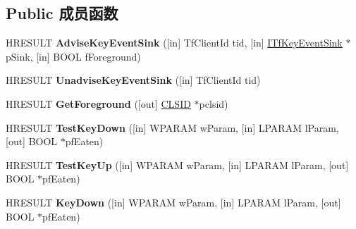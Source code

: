\subsection*{Public 成员函数}
\begin{DoxyCompactItemize}
\item 
\mbox{\label{interface_i_tf_keystroke_mgr_aaabaa2af43516158f9b20932da8704c3}} 
H\+R\+E\+S\+U\+LT {\bfseries Advise\+Key\+Event\+Sink} (\mbox{[}in\mbox{]} Tf\+Client\+Id tid, \mbox{[}in\mbox{]} \hyperlink{interface_i_tf_key_event_sink}{I\+Tf\+Key\+Event\+Sink} $\ast$p\+Sink, \mbox{[}in\mbox{]} B\+O\+OL f\+Foreground)
\item 
\mbox{\label{interface_i_tf_keystroke_mgr_aa2b890d78a18d51e628d4a2f98f27448}} 
H\+R\+E\+S\+U\+LT {\bfseries Unadvise\+Key\+Event\+Sink} (\mbox{[}in\mbox{]} Tf\+Client\+Id tid)
\item 
\mbox{\label{interface_i_tf_keystroke_mgr_afe57782c3ec87b9ffc01d60b79a552ce}} 
H\+R\+E\+S\+U\+LT {\bfseries Get\+Foreground} (\mbox{[}out\mbox{]} \hyperlink{struct___i_i_d}{C\+L\+S\+ID} $\ast$pclsid)
\item 
\mbox{\label{interface_i_tf_keystroke_mgr_aa10c367e680fb26b959d3b06d8277234}} 
H\+R\+E\+S\+U\+LT {\bfseries Test\+Key\+Down} (\mbox{[}in\mbox{]} W\+P\+A\+R\+AM w\+Param, \mbox{[}in\mbox{]} L\+P\+A\+R\+AM l\+Param, \mbox{[}out\mbox{]} B\+O\+OL $\ast$pf\+Eaten)
\item 
\mbox{\label{interface_i_tf_keystroke_mgr_a3e3e07d41087524e06f6c8a1c7969c11}} 
H\+R\+E\+S\+U\+LT {\bfseries Test\+Key\+Up} (\mbox{[}in\mbox{]} W\+P\+A\+R\+AM w\+Param, \mbox{[}in\mbox{]} L\+P\+A\+R\+AM l\+Param, \mbox{[}out\mbox{]} B\+O\+OL $\ast$pf\+Eaten)
\item 
\mbox{\label{interface_i_tf_keystroke_mgr_a1ed82684f61bfa63338c4bd04e1f2f51}} 
H\+R\+E\+S\+U\+LT {\bfseries Key\+Down} (\mbox{[}in\mbox{]} W\+P\+A\+R\+AM w\+Param, \mbox{[}in\mbox{]} L\+P\+A\+R\+AM l\+Param, \mbox{[}out\mbox{]} B\+O\+OL $\ast$pf\+Eaten)
\item 
\mbox{\label{interface_i_tf_keystroke_mgr_a4ab60ac2131cedab6348e2435aa08eee}} 

\end{DoxyCompactItemize}
